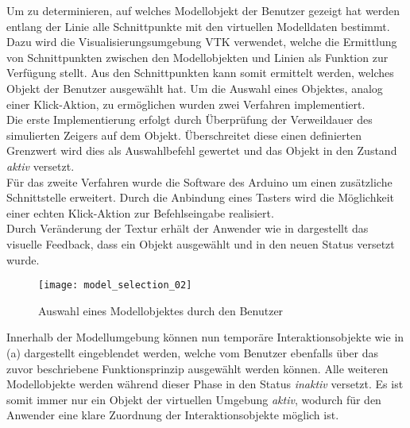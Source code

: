 Um zu determinieren, auf welches Modellobjekt der Benutzer gezeigt hat werden entlang der Linie alle Schnittpunkte mit den virtuellen Modelldaten bestimmt. Dazu wird die Visualisierungsumgebung VTK verwendet, welche die Ermittlung von Schnittpunkten zwischen den Modellobjekten und Linien als Funktion zur Verfügung stellt. Aus den Schnittpunkten kann somit ermittelt werden, welches Objekt der Benutzer ausgewählt hat. Um die Auswahl eines Objektes, analog einer \glqq Klick\grqq -Aktion, zu ermöglichen wurden zwei Verfahren implementiert.\\
Die erste Implementierung erfolgt durch Überprüfung der Verweildauer des simulierten Zeigers auf dem Objekt. Überschreitet diese einen definierten Grenzwert wird dies als Auswahlbefehl gewertet und das Objekt in den Zustand \textit{aktiv} versetzt.\\
Für das zweite Verfahren wurde die Software des Arduino um einen zusätzliche Schnittstelle erweitert. Durch die Anbindung eines Tasters wird die Möglichkeit einer echten \glqq Klick\grqq -Aktion zur Befehlseingabe realisiert.\\
Durch Veränderung der Textur erhält der Anwender wie in  dargestellt das visuelle Feedback, dass ein Objekt ausgewählt und in den neuen Status versetzt wurde.

\begin{figure}[!ht]
	\begin{center}
	\texttt{[image: model\_selection\_02]}
	\caption{Auswahl eines Modellobjektes durch den Benutzer}
	\label{fig.intintersect}
	\end{center}
\end{figure}


Innerhalb der Modellumgebung können nun temporäre Interaktionsobjekte wie in  (a) dargestellt eingeblendet werden, welche vom Benutzer ebenfalls über das zuvor beschriebene Funktionsprinzip ausgewählt werden können. Alle weiteren Modellobjekte werden während dieser Phase in den Status \textit{inaktiv} versetzt. Es ist somit immer nur ein Objekt der virtuellen Umgebung \textit{aktiv}, wodurch für den Anwender eine klare Zuordnung der Interaktionsobjekte möglich ist.

